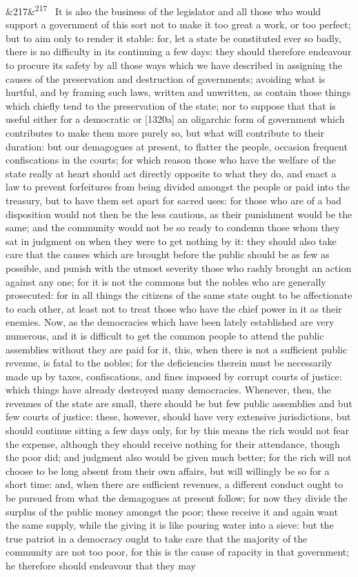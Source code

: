 \documentclass[12pt]{article}
\newcommand{\para}[1][]{\par\noindent\ifx&#1&\else\textsuperscript{\footnotesize #1}~\fi}
\begin{document}
\para[217] It is also the business of the legislator and all those who would support a government of this sort not to make it too great a work, or too perfect; but to aim only to render it stable: for, let a state be constituted ever so badly, there is no difficulty in its continuing a few days: they should therefore endeavour to procure its safety by all those ways which we have described in assigning the causes of the preservation and destruction of governments; avoiding what is hurtful, and by framing such laws, written and unwritten, as contain those things which chiefly tend to the preservation of the state; nor to suppose that that is useful either for a democratic or [1320a] an oligarchic form of government which contributes to make them more purely so, but what will contribute to their duration: but our demagogues at present, to flatter the people, occasion frequent confiscations in the courts; for which reason those who have the welfare of the state really at heart should act directly opposite to what they do, and enact a law to prevent forfeitures from being divided amongst the people or paid into the treasury, but to have them set apart for sacred uses: for those who are of a bad disposition would not then be the less cautious, as their punishment would be the same; and the community would not be so ready to condemn those whom they sat in judgment on when they were to get nothing by it: they should also take care that the causes which are brought before the public should be as few as possible, and punish with the utmost severity those who rashly brought an action against any one; for it is not the commons but the nobles who are generally prosecuted: for in all things the citizens of the same state ought to be affectionate to each other, at least not to treat those who have the chief power in it as their enemies. Now, as the democracies which have been lately established are very numerous, and it is difficult to get the common people to attend the public assemblies without they are paid for it, this, when there is not a sufficient public revenue, is fatal to the nobles; for the deficiencies therein must be necessarily made up by taxes, confiscations, and fines imposed by corrupt courts of justice: which things have already destroyed many democracies. Whenever, then, the revenues of the state are small, there should be but few public assemblies and but few courts of justice: these, however, should have very extensive jurisdictions, but should continue sitting a few days only, for by this means the rich would not fear the expense, although they should receive nothing for their attendance, though the poor did; and judgment also would be given much better; for the rich will not choose to be long absent from their own affairs, but will willingly be so for a short time: and, when there are sufficient revenues, a different conduct ought to be pursued from what the demagogues at present follow; for now they divide the surplus of the public money amongst the poor; these receive it and again want the same supply, while the giving it is like pouring water into a sieve: but the true patriot in a democracy ought to take care that the majority of the community are not too poor, for this is the cause of rapacity in that government; he therefore should endeavour that they may 
\end{document}
